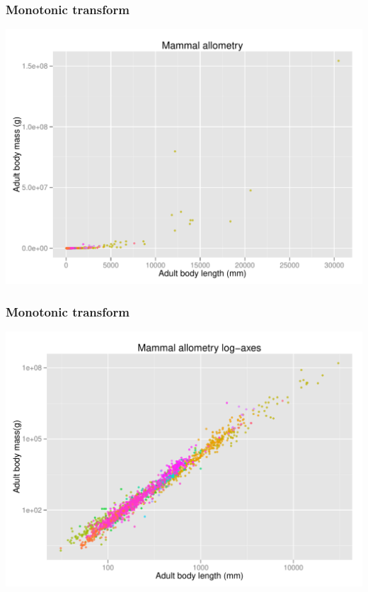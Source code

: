 \documentclass{beamer}\usepackage{graphicx, color}
\makeatletter
\def\maxwidth{ %
  \ifdim\Gin@nat@width>\linewidth
    \linewidth
  \else
    \Gin@nat@width
  \fi
}
\newenvironment{knitrout}{}{} %
\makeatother
\begin{document}
\begin{frame}
\frametitle{Monotonic transform}

\begin{knitrout}
\color{fgcolor}\includegraphics[width=\maxwidth]{figure/body-sze} 
\end{knitrout}

\end{frame}


\begin{frame}
\frametitle{Monotonic transform}

\begin{knitrout}
\color{fgcolor}\includegraphics[width=\maxwidth]{figure/body-sze-log} 
\end{knitrout}

\end{frame}
\end{document}
